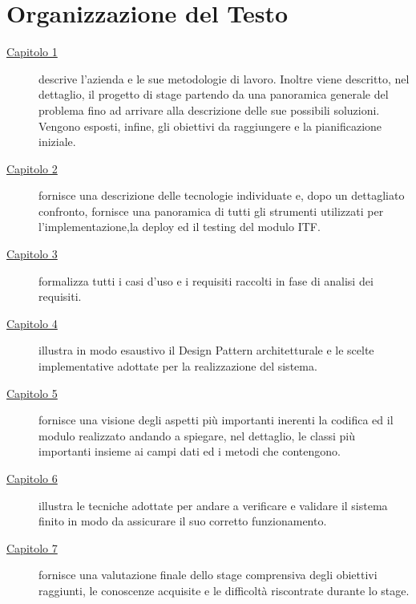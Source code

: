 
\cleardoublepage
{}
{}
\begingroup
\let\clearpage\relax
\let\cleardoublepage\relax
\let\cleardoublepage\relax

\chapter*{Organizzazione del Testo}

\begin{description}
	\item[{\hyperref[cap:introduzione]{Capitolo 1}}] descrive l'azienda e le sue metodologie di lavoro. Inoltre viene descritto, nel dettaglio, il progetto di stage partendo da una panoramica generale del problema fino ad arrivare alla descrizione delle sue possibili soluzioni. Vengono esposti, infine, gli obiettivi da raggiungere e la pianificazione iniziale.
	
	\item[{\hyperref[cap:tecnologie_e_strumenti]{Capitolo 2}}] fornisce una descrizione delle tecnologie individuate e, dopo un dettagliato confronto, fornisce una panoramica di tutti gli strumenti utilizzati per l'implementazione,la deploy ed il testing del modulo ITF. 
	
	\item[{\hyperref[cap:analisi_dei_requisiti]{Capitolo 3}}] formalizza tutti i casi d'uso e i requisiti raccolti in fase di analisi dei requisiti.
	
	\item[{\hyperref[cap:progettazione]{Capitolo 4}}] illustra in modo esaustivo il Design Pattern architetturale e le scelte implementative adottate per la realizzazione del sistema.
	
	\item[{\hyperref[cap:codifica]{Capitolo 5}}] fornisce una visione degli aspetti più importanti inerenti la codifica ed il modulo realizzato andando a spiegare, nel dettaglio, le classi più importanti insieme ai campi dati ed i metodi che contengono.
	
	\item[{\hyperref[cap:verifica_validazione]{Capitolo 6}}] illustra le tecniche adottate per andare a verificare e validare il sistema finito in modo da assicurare il suo corretto funzionamento.
	
	\item[{\hyperref[cap:valutazione_finale]{Capitolo 7}}] fornisce una valutazione finale dello stage comprensiva degli obiettivi raggiunti, le conoscenze acquisite e le difficoltà riscontrate durante lo stage.
	
\end{description}

